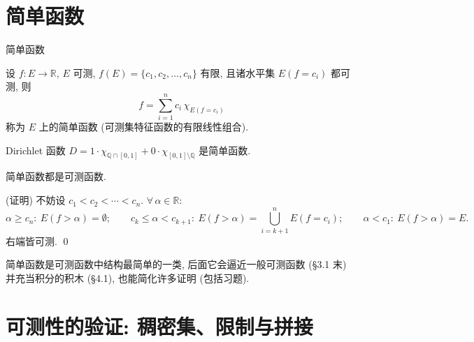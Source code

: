 
\section{简单函数}


\begin{frame}{简单函数}

\begin{Def}[简单函数]
设 $f: E \to \mathbb{R}$, $E$ 可测, $f(E) = \{c_1, c_2, \ldots, c_n\}$ 有限, 且诸水平集 $E(f = c_i)$ 都可测, 则
\[
f = \sum_{i=1}^{n} c_i\, \chi_{E(f = c_i)}
\]
称为 $E$ 上的\alert{简单函数} (可测集特征函数的有限线性组合).
\end{Def}

\begin{eg}
Dirichlet 函数 $D = 1 \cdot \chi_{\mathbb{Q} \cap [0,1]} + 0 \cdot \chi_{[0,1] \setminus \mathbb{Q}}$ 是简单函数.
\end{eg}

\pause

\begin{lem}[简单函数可测]
简单函数都是可测函数.
\end{lem}

\startproof[bg=yellow, fg=red](证明)
不妨设 $c_1 < c_2 < \cdots < c_n$. $\forall\, \alpha \in \mathbb{R}$:
\[
\alpha \geqslant c_n:\ E(f>\alpha) = \emptyset; \qquad
c_k \leqslant \alpha < c_{k+1}:\ E(f>\alpha) = \bigcup_{i=k+1}^{n} E(f = c_i); \qquad
\alpha < c_1:\ E(f>\alpha) = E.
\]
右端皆可测.
\qed

\pause

\begin{remark}
简单函数是可测函数中结构最简单的一类, 后面它会\alert{逼近一般可测函数} (\S 3.1 末) 并充当积分的积木 (\S 4.1), 也能简化许多证明 (包括习题).
\end{remark}

\end{frame}


\section[验证技巧]{可测性的验证: 稠密集、限制与拼接}


